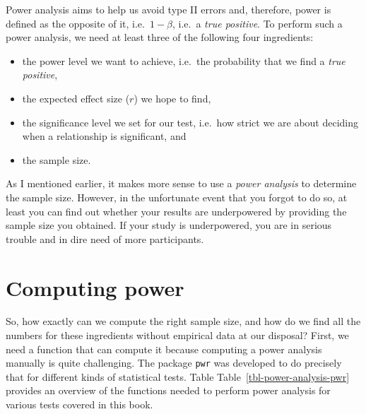 \documentclass[
  letterpaper,
]{krantz}
\begin{document}
Power analysis aims to help us avoid type II errors and, therefore,
power is defined as the opposite of it, i.e.~\(1 - \beta\), i.e.~a
\emph{true positive}. To perform such a power analysis, we need at least
three of the following four ingredients:

\begin{itemize}
\item
  the power level we want to achieve, i.e.~the probability that we find
  a \emph{true positive},
\item
  the expected effect size (\(r\)) we hope to find,
\item
  the significance level we set for our test, i.e.~how strict we are
  about deciding when a relationship is significant, and
\item
  the sample size.
\end{itemize}

As I mentioned earlier, it makes more sense to use a \emph{power
analysis} to determine the sample size. However, in the unfortunate
event that you forgot to do so, at least you can find out whether your
results are underpowered by providing the sample size you obtained. If
your study is underpowered, you are in serious trouble and in dire need
of more participants.

\section{Computing power}\label{sec-computing-power}

So, how exactly can we compute the right sample size, and how do we find
all the numbers for these ingredients without empirical data at our
disposal? First, we need a function that can compute it because
computing a power analysis manually is quite challenging. The package
\texttt{pwr} was developed to do precisely that for different kinds of
statistical tests. Table Table~\ref{tbl-power-analysis-pwr} provides an
overview of the functions needed to perform power analysis for various
tests covered in this book.
\end{document}
